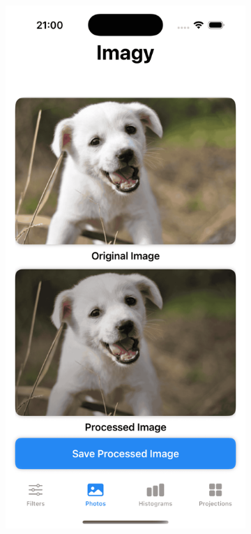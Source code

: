 \documentclass[a4paper]{article}
\begin{document}
\begin{figure}[H]
\begin{subfigure}{0.2\textwidth}
        \label{fig:dog_sobel}
    \end{subfigure}
    \hfill
    \begin{subfigure}{0.2\textwidth}
        \centering
        \includegraphics[width=\linewidth]{images/dog_vignette.png}

\end{subfigure}
\end{figure}
\end{document}
